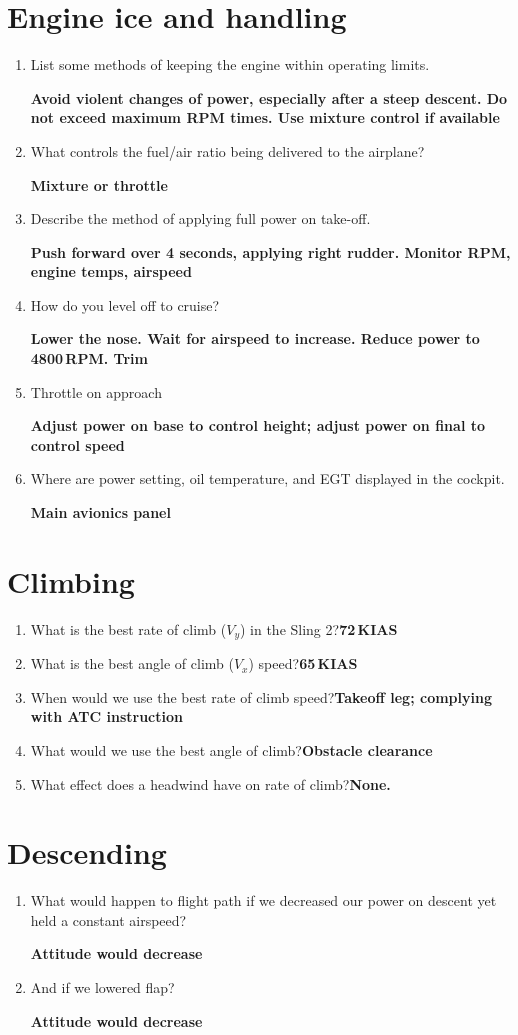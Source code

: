 \documentclass[11pt]{article}
\begin{document}
\section{Engine ice and handling}
\begin{enumerate}
	\item List some methods of keeping the engine within operating limits.

	\textbf{Avoid violent changes of power, especially after a steep descent. Do not exceed maximum RPM times. Use mixture control if available}
	\item What controls the fuel/air ratio being delivered to the airplane?

	\textbf{Mixture or throttle}
	\item Describe the method of applying full power on take-off.

	\textbf{Push forward over 4 seconds, applying right rudder. Monitor RPM, engine temps, airspeed}
	\item How do you level off to cruise?

	\textbf{Lower the nose. Wait for airspeed to increase. Reduce power to 4800\,RPM. Trim}
	\item Throttle on approach

	\textbf{Adjust power on base to control height; adjust power on final to control speed}
	\item Where are power setting, oil temperature, and EGT displayed in the cockpit. 

	\textbf{Main avionics panel}
\end{enumerate}
\section{Climbing}
\begin{enumerate}
	\item What is the best rate of climb (\(V_y\)) in the Sling 2?\hfill\textbf{72\,KIAS}
	\item What is the best angle of climb (\(V_x\)) speed?\hfill\textbf{65\,KIAS}
	\item When would we use the best rate of climb speed?\hfill\textbf{Takeoff leg; complying with ATC instruction}
	\item What would we use the best angle of climb?\hfill\textbf{Obstacle clearance}
	\item What effect does a headwind have on rate of climb?\hfill\textbf{None.}
\end{enumerate}
\section{Descending}
\begin{enumerate}
	\item What would happen to flight path if we decreased our power on descent yet held a constant airspeed?

	\textbf{Attitude would decrease}
	\item And if we lowered flap?

	\textbf{Attitude would decrease}
\end{enumerate}
\end{document}
